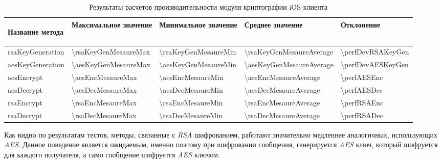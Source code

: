 \begin{table}[!ht]
  \caption{Результаты расчетов производительности модуля криптографии iOS-клиента}
  \label{sec:eng:performance:aesenc:result}
  \centering
  \begin{tabularx}{\linewidth}{
    |>{\hsize=1.5\hsize}X|
    >{\centering\arraybackslash\hsize=0.95\hsize}X|
    >{\centering\arraybackslash\hsize=0.95\hsize}X|
    >{\centering\arraybackslash\hsize=0.95\hsize}X|
    >{\centering\arraybackslash\hsize=0.25\hsize}X|
  }
	\hline
 \begin{center}Название метода\end{center} & Максимальное значение &  Минимальное значение & Среднее значение & Отклонение \\
 \hline
 rsaKeyGeneration & \num{\rsaKeyGenMesaureMax} & \num{\rsaKeyGenMesaureMin} & \num{\rsaKeyGenMesaureAverage} & \num{\perfDevRSAKeyGen} \\
 \hline
 aesKeyGeneration & \num{\aesKeyGenMesaureMax} & \num{\aesKeyGenMesaureMin} & \num{\aesKeyGenMesaureAverage} & \num{\perfDevAESKeyGen} \\
 \hline
 aesEncrypt & \num{\aesEncMesaureMax} & \num{\aesEncMesaureMin} & \num{\aesEncMesaureAverage} & \num{\perfAESEnc} \\
 \hline
 aesDecrypt & \num{\aesDecMesaureMax} & \num{\aesDecMesaureMin} & \num{\aesDecMesaureAverage} & \num{\perfAESDec} \\
 \hline
 rsaEncrypt & \num{\rsaEncMesaureMax} & \num{\rsaEncMesaureMin} & \num{\rsaEncMesaureAverage} & \num{\perfRSAEnc} \\
 \hline
 rsaDecrypt & \num{\rsaDecMesaureMax} & \num{\rsaDecMesaureMin} & \num{\rsaDecMesaureAverage} & \num{\perfRSADec} \\
 \hline
\end{tabularx}
\end{table}

Как видно по результатам тестов, методы, связанные с \textit{RSA} шифрованием, работают значительно медленнее аналогичных, использующих \textit{AES}. Данное поведение является ожидаемым, именно поэтому при шифровании сообщения, генерируется \textit{AES} ключ, который шифруется для каждого получателя, а само сообщение шифруется \textit{AES} ключом.